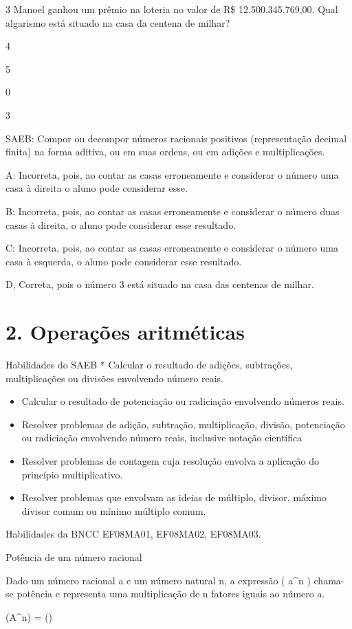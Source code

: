 \num{3} Manoel ganhou um prêmio na loteria no valor de R\$ 12.500.345.769,00.
Qual algarismo está situado na casa da centena de milhar?
\item4
\item5
\item0
\item3

SAEB: Compor ou decompor números racionais positivos (representação
decimal finita) na forma aditiva, ou em suas ordens, ou em adições e
multiplicações.

A: Incorreta, pois, ao contar as casas erroneamente e considerar o
número uma casa à direita o aluno pode considerar esse.

B: Incorreta, pois, ao contar as casas erroneamente e considerar o
número duas casas à direita, o aluno pode considerar esse resultado.

C: Incorreta, pois, ao contar as casas erroneamente e considerar o
número uma casa à esquerda, o aluno pode considerar esse resultado.

D, Correta, pois o número 3 está situado na casa das centenas de milhar.


\section{2. Operações
aritméticas}

Habilidades do SAEB * Calcular o resultado de adições, subtrações,
multiplicações ou divisões envolvendo número reais.

\begin{itemize}
\item
  Calcular o resultado de potenciação ou radiciação envolvendo números
  reais.
\item
  Resolver problemas de adição, subtração, multiplicação, divisão,
  potenciação ou radiciação envolvendo número reais, inclusive notação
  científica
\item
  Resolver problemas de contagem cuja resolução envolva a aplicação do
  princípio multiplicativo.
\item
  Resolver problemas que envolvam as ideias de múltiplo, divisor, máximo
  divisor comum ou mínimo múltiplo comum.
\end{itemize}

Habilidades da BNCC EF08MA01, EF08MA02, EF08MA03.

Potência de um número racional

Dado um número racional a e um número natural n, a expressão ( a^n )
chama-se potência e representa uma multiplicação de n fatores iguais ao
número a.

(A^n) =
()

